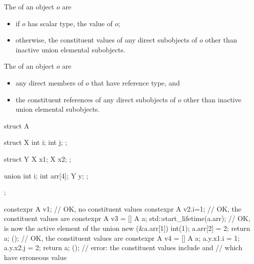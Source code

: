 \pnum
The  of an object $o$ are
\begin{itemize}
\item
if $o$ has scalar type, the value of $o$;
\item
otherwise, the constituent values of any direct subobjects of $o$
other than inactive union elemental subobjects.
\end{itemize}
The  of an object $o$ are
\begin{itemize}
\item
any direct members of $o$ that have reference type, and
\item
the constituent references of any direct subobjects of $o$
other than inactive union elemental subobjects.
\end{itemize}
\begin{example}
\begin{codeblock}
struct A {
  struct X {
    int i;
    int j;
  };

  struct Y {
    X x1;
    X x2;
  };

  union {
    int i;
    int arr[4];
    Y y;
  };
};

constexpr A v1;         // OK, no constituent values
constexpr A v2{.i=1};   // OK, the constituent values are 
constexpr A v3 = []{
  A a;
  std::start_lifetime(a.arr);   // OK,  is now the active element of the union
  new (&a.arr[1]) int(1);
  a.arr[2] = 2;
  return a;
}();                    // OK, the constituent values are 
constexpr A v4 = []{
  A a;
  a.y.x1.i = 1;
  a.y.x2.j = 2;
  return a;
}();                    // error: the constituent values include  and 
                        // which have erroneous value
\end{codeblock}
\end{example}

